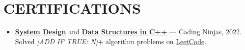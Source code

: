 \documentclass[letterpaper,11pt]{article}
\newcommand{\resumeItem}[1]{\item\small{{#1 \vspace{-2pt}}}}
\newcommand{\resumeItemListStart}{\begin{itemize}}
\newcommand{\resumeItemListEnd}{\end{itemize}\vspace{-5pt}}
\begin{document}
\vspace{-6pt}

\section{CERTIFICATIONS}
    \vspace{2pt}
    \resumeItemListStart
        \resumeItem{\href{http://ninjasfiles.s3.amazonaws.com/certificate18894980e4209379ac28665887f78da42bac5c2.pdf}{\textbf{System Design}} and \href{https://ninjasfiles.s3.amazonaws.com/certificate19853580c201378561a01f48ae87f59e9220db2.pdf}{\textbf{Data Structures in C++}} — Coding Ninjas, 2022. Solved \textit{[ADD IF TRUE: N]}+ algorithm problems on \href{https://leetcode.com/u/sachinkumar6174/}{LeetCode}.}
    \resumeItemListEnd
\end{document}
